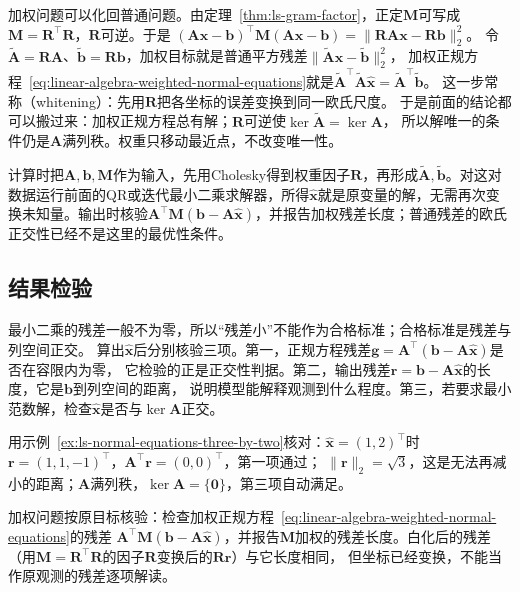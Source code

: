 加权问题可以化回普通问题。由定理~\ref{thm:ls-gram-factor}，正定$\bm M$可写成
$\bm M=\bm R^\top\bm R$，$\bm R$可逆。于是
$(\bm A\bm x-\bm b)^\top\bm M(\bm A\bm x-\bm b)=\lVert\bm R\bm A\bm x-\bm R\bm b\rVert_2^2$。
令$\tilde{\bm A}=\bm R\bm A$、$\tilde{\bm b}=\bm R\bm b$，加权目标就是普通平方残差$\lVert\tilde{\bm A}\bm x-\tilde{\bm b}\rVert_2^2$，
加权正规方程~\eqref{eq:linear-algebra-weighted-normal-equations}就是$\tilde{\bm A}^\top\tilde{\bm A}\hat{\bm x}=\tilde{\bm A}^\top\tilde{\bm b}$。
这一步常称（whitening）：先用$\bm R$把各坐标的误差变换到同一欧氏尺度。
于是前面的结论都可以搬过来：加权正规方程总有解；$\bm R$可逆使$\ker\tilde{\bm A}=\ker\bm A$，
所以解唯一的条件仍是$\bm A$满列秩。权重只移动最近点，不改变唯一性。

计算时把$\bm A,\bm b,\bm M$作为输入，先用Cholesky得到权重因子$\bm R$，再形成$\tilde{\bm A},\tilde{\bm b}$。对这对数据运行前面的QR或迭代最小二乘求解器，所得$\hat{\bm x}$就是原变量的解，无需再次变换未知量。输出时核验$\bm A^\top\bm M(\bm b-\bm A\hat{\bm x})$，并报告加权残差长度；普通残差的欧氏正交性已经不是这里的最优性条件。

\subsection{结果检验}
\label{sec:ls-least-squares-verification}

最小二乘的残差一般不为零，所以“残差小”不能作为合格标准；合格标准是残差与列空间正交。
算出$\hat{\bm x}$后分别核验三项。第一，正规方程残差$\bm g=\bm A^\top(\bm b-\bm A\hat{\bm x})$是否在容限内为零，
它检验的正是正交性判据。第二，输出残差$\bm r=\bm b-\bm A\hat{\bm x}$的长度，它是$\bm b$到列空间的距离，
说明模型能解释观测到什么程度。第三，若要求最小范数解，检查$\hat{\bm x}$是否与$\ker\bm A$正交。

用示例~\ref{ex:ls-normal-equations-three-by-two}核对：$\hat{\bm x}=(1,2)^\top$时$\bm r=(1,1,-1)^\top$，$\bm A^\top\bm r=(0,0)^\top$，第一项通过；
$\lVert\bm r\rVert_2=\sqrt3$，这是无法再减小的距离；$\bm A$满列秩，$\ker\bm A=\{\bm0\}$，第三项自动满足。

加权问题按原目标核验：检查加权正规方程~\eqref{eq:linear-algebra-weighted-normal-equations}的残差
$\bm A^\top\bm M(\bm b-\bm A\hat{\bm x})$，并报告$\bm M$加权的残差长度。白化后的残差（用$\bm M=\bm R^\top\bm R$的因子$\bm R$变换后的$\bm R\bm r$）与它长度相同，
但坐标已经变换，不能当作原观测的残差逐项解读。



